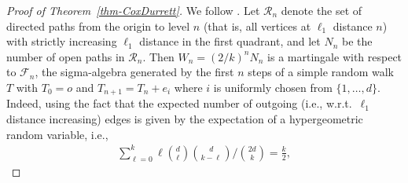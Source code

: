 \documentclass[oneside]{amsart}
\theoremstyle{definition}
\newcommand{\1}{\mathbbm{1}}
\newcommand{\0}{\mathbf{o}}
\numberwithin{equation}{section}
\begin{document}
\begin{proof}[Proof of Theorem~\ref{thm-CoxDurrett}]
 We follow \cite[Section 2]{CoxDurrett}. Let $\mathcal R_n$ denote the set of directed paths from the origin to level $n$ (that is, all vertices at $\ell_1$ distance $n$) with strictly increasing $\ell_1$ distance in the first quadrant, and let $N_n$ be the number of open paths in $\mathcal R_n$. Then $W_n=(2/k)^nN_n$ is a martingale with respect to $\mathcal F_n$, the sigma-algebra generated by the first $n$ steps of a simple random walk $T$ with $T_0=o$ and $T_{n+1}=T_n+e_i$ where $i$ is uniformly chosen from $\{1,\dots ,d\}$. Indeed, using the fact that the expected number of outgoing (i.e., w.r.t.\ $\ell_1$ distance increasing) edges  is given by the expectation of a hypergeometric random variable, i.e., 
\begin{align*}
\sum_{\ell=0}^k \ell\binom{d}{\ell}\binom{d}{k-\ell}\Big/\binom{2d}{k}=\frac{k}{2},
\end{align*}


\end{proof}
\end{document}
